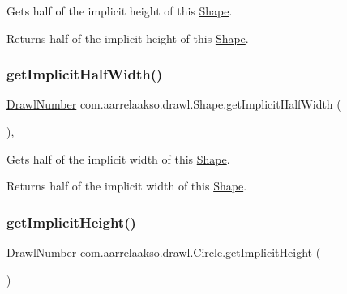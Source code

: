 Gets half of the implicit height of this \hyperlink{classcom_1_1aarrelaakso_1_1drawl_1_1_shape}{Shape}. 

\begin{DoxyReturn}{Returns}
half of the implicit height of this \hyperlink{classcom_1_1aarrelaakso_1_1drawl_1_1_shape}{Shape}. 
\end{DoxyReturn}
\mbox{\label{classcom_1_1aarrelaakso_1_1drawl_1_1_shape_ac796f934debb4cf92d285f387422deb6}} 
\subsubsection{\texorpdfstring{get\+Implicit\+Half\+Width()}{getImplicitHalfWidth()}}
{\footnotesize\ttfamily \hyperlink{classcom_1_1aarrelaakso_1_1drawl_1_1_drawl_number}{Drawl\+Number} com.\+aarrelaakso.\+drawl.\+Shape.\+get\+Implicit\+Half\+Width (\begin{DoxyParamCaption}{ }\end{DoxyParamCaption})\hspace{0.3cm}{\ttfamily [protected]}, {\ttfamily [inherited]}}



Gets half of the implicit width of this \hyperlink{classcom_1_1aarrelaakso_1_1drawl_1_1_shape}{Shape}. 

\begin{DoxyReturn}{Returns}
half of the implicit width of this \hyperlink{classcom_1_1aarrelaakso_1_1drawl_1_1_shape}{Shape}. 
\end{DoxyReturn}
\mbox{\label{classcom_1_1aarrelaakso_1_1drawl_1_1_circle_a866cede87fd3253b3e4f93d9970717c3}} 
\subsubsection{\texorpdfstring{get\+Implicit\+Height()}{getImplicitHeight()}}
{\footnotesize\ttfamily \hyperlink{classcom_1_1aarrelaakso_1_1drawl_1_1_drawl_number}{Drawl\+Number} com.\+aarrelaakso.\+drawl.\+Circle.\+get\+Implicit\+Height (\begin{DoxyParamCaption}{ }\end{DoxyParamCaption})\hspace{0.3cm}{\ttfamily [protected]}}



